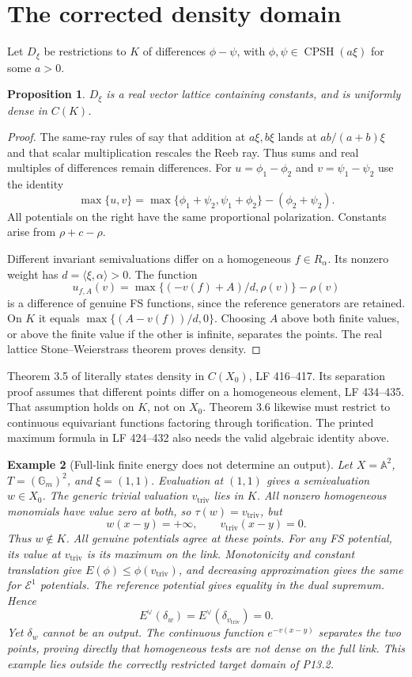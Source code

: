 \documentclass[11pt]{article}
\newcommand{\CPSH}{\operatorname{CPSH}}
\newcommand{\EE}{\mathcal E^1}
\newcommand{\triv}{\mathrm{triv}}
\newtheorem{proposition}{Proposition}
\newtheorem{example}[proposition]{Example}
\theoremstyle{remark}
\begin{document}
\section{The corrected density domain}
Let $D_\xi$ be restrictions to $K$ of differences $\phi-\psi$, with $\phi,\psi\in\CPSH(a\xi)$ for some $a>0$.
\begin{proposition}
$D_\xi$ is a real vector lattice containing constants, and is uniformly dense in $C(K)$.
\end{proposition}
\begin{proof}
The same-ray rules of \cite[Proposition 3.3]{Wu24} say that addition at $a\xi,b\xi$ lands at $ab/(a+b)\xi$ and that scalar multiplication rescales the Reeb ray. Thus sums and real multiples of differences remain differences. For $u=\phi_1-\phi_2$ and $v=\psi_1-\psi_2$ use the identity
\[
 \max\{u,v\}=\max\{\phi_1+\psi_2,\psi_1+\phi_2\}-(\phi_2+\psi_2).
\]
All potentials on the right have the same proportional polarization. Constants arise from $\rho+c-\rho$.

Different invariant semivaluations differ on a homogeneous $f\in R_\alpha$. Its nonzero weight has $d=\langle\xi,\alpha\rangle>0$. The function
\[
 u_{f,A}(v)=\max\{(-v(f)+A)/d,\rho(v)\}-\rho(v)
\]
is a difference of genuine FS functions, since the reference generators are retained. On $K$ it equals $\max\{(A-v(f))/d,0\}$. Choosing $A$ above both finite values, or above the finite value if the other is infinite, separates the points. The real lattice Stone--Weierstrass theorem proves density.
\end{proof}

Theorem 3.5 of \cite{Wu24} literally states density in $C(X_0)$, LF 416--417. Its separation proof assumes that different points differ on a homogeneous element, LF 434--435. That assumption holds on $K$, not on $X_0$. Theorem 3.6 likewise must restrict to continuous equivariant functions factoring through torification. The printed maximum formula in LF 424--432 also needs the valid algebraic identity above.

\begin{example}[Full-link finite energy does not determine an output]
Let $X=\mathbb A^2$, $T=(\mathbb G_m)^2$, and $\xi=(1,1)$. Evaluation at $(1,1)$ gives a semivaluation $w\in X_0$. The generic trivial valuation $v_\triv$ lies in $K$. All nonzero homogeneous monomials have value zero at both, so $\tau(w)=v_\triv$, but
\[
 w(x-y)=+\infty,\qquad v_\triv(x-y)=0.
\]
Thus $w\notin K$. All genuine potentials agree at these points. For any FS potential, its value at $v_\triv$ is its maximum on the link. Monotonicity and constant translation give $E(\phi)\le\phi(v_\triv)$, and decreasing approximation gives the same for $\EE$ potentials. The reference potential gives equality in the dual supremum. Hence
\[
 E^\vee(\delta_w)=E^\vee(\delta_{v_\triv})=0.
\]
Yet $\delta_w$ cannot be an output. The continuous function $e^{-v(x-y)}$ separates the two points, proving directly that homogeneous tests are not dense on the full link. This example lies outside the correctly restricted target domain of P13.2.
\end{example}
\end{document}
